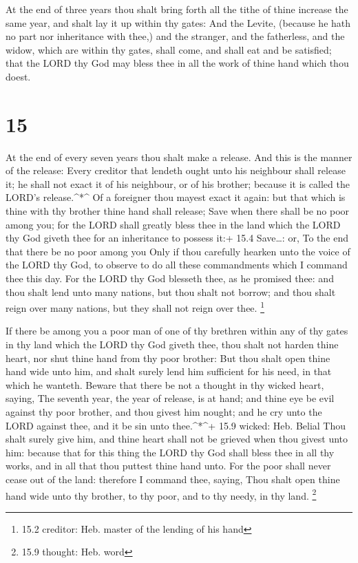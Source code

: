  At the end of three years thou shalt bring forth all the
tithe of thine increase the same year, and shalt lay it up within thy
gates:  And the Levite, (because he hath no part nor
inheritance with thee,) and the stranger, and the fatherless, and the
widow, which are within thy gates, shall come, and shall eat and be
satisfied; that the LORD thy God may bless thee in all the work of thine
hand which thou doest.

\hypertarget{section-14}{%
\section{15}\label{section-14}}

 At the end of every seven years thou shalt make a release.
 And this is the manner of the release: Every creditor that
lendeth ought unto his neighbour shall release it; he shall not exact it
of his neighbour, or of his brother; because it is called the LORD's
release.\^{}*\^{}  Of a foreigner thou mayest exact it
again: but that which is thine with thy brother thine hand shall
release;  Save when there shall be no poor among you; for
the LORD shall greatly bless thee in the land which the LORD thy God
giveth thee for an inheritance to possess it:+ 15.4 Save\ldots: or, To
the end that there be no poor among you  Only if thou
carefully hearken unto the voice of the LORD thy God, to observe to do
all these commandments which I command thee this day.  For
the LORD thy God blesseth thee, as he promised thee: and thou shalt lend
unto many nations, but thou shalt not borrow; and thou shalt reign over
many nations, but they shall not reign over thee. \footnote{15.2
  creditor: Heb. master of the lending of his hand}

 If there be among you a poor man of one of thy brethren
within any of thy gates in thy land which the LORD thy God giveth thee,
thou shalt not harden thine heart, nor shut thine hand from thy poor
brother:  But thou shalt open thine hand wide unto him, and
shalt surely lend him sufficient for his need, in that which he wanteth.
 Beware that there be not a thought in thy wicked heart,
saying, The seventh year, the year of release, is at hand; and thine eye
be evil against thy poor brother, and thou givest him nought; and he cry
unto the LORD against thee, and it be sin unto thee.\^{}*\^{}+ 15.9
wicked: Heb. Belial  Thou shalt surely give him, and thine
heart shall not be grieved when thou givest unto him: because that for
this thing the LORD thy God shall bless thee in all thy works, and in
all that thou puttest thine hand unto.  For the poor shall
never cease out of the land: therefore I command thee, saying, Thou
shalt open thine hand wide unto thy brother, to thy poor, and to thy
needy, in thy land. \footnote{15.9 thought: Heb. word}

